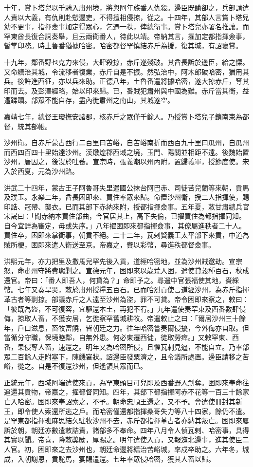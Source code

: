 \begin{pinyinscope}
十年，賞卜塔兒以千騎入肅州境，將與阿年族番人仇殺。邊臣既諭卻之，兵部請遣人責以大義，有仇則赴愬邊吏，不得擅相侵掠，從之。十四年，其部人言賞卜塔兒幼不更事，指揮僉事加定得眾心，乞遷一秩，俾總衛事。賞卜塔兒亦署名推讓。而罕東酋長復合詞奏舉，且云兩衛番人，待此以靖。帝納其言，擢加定都指揮僉事，暫掌印務。時土魯番猶據哈密。哈密都督罕慎結赤斤為援，復其城，有詔褒賞。

十九年，鄰番野乜克力來侵，大肆殺掠，赤斤遂殘破。其酋長訴於邊臣，給之慄。又命繕治其城，令流移者復業，赤斤自是不振。然弘治中，阿木郎破哈密，猶用其兵。後許進西征，亦以兵來助。正德八年，土魯番遣將據哈密，遂大掠赤斤，奪其印而去。及彭澤經略，始以印來歸。已，番賊犯肅州與中國為難。赤斤當其衝，益遭蹂躪。部眾不能自存，盡內徙肅州之南山，其城遂空。

嘉靖七年，總督王瓊撫安諸郡，核赤斤之眾僅千餘人。乃授賞卜塔兒子鎖南束為都督，統其部帳。

沙州衛。自赤斤蒙古西行二百里曰苦峪，自苦峪南折而西百九十里曰瓜州，自瓜州而西四百四十里始達沙州。漢燉煌郡西域之境，玉門、陽關並相距不遠。後魏始置沙州，唐因之，後沒於吐蕃。宣宗時，張義潮以州內附，置歸義軍，授節度使。宋入於西夏，元為沙州路。

洪武二十四年，蒙古王子阿魯哥失里遣國公抹台阿巴赤、司徒苦兒蘭等來朝，貢馬及璞玉。永樂二年，酋長困即來、買住率眾來歸。命置沙州衛，授二人指揮使，賜印誥、冠帶、襲衣。已而其部下赤納來附，授都指揮僉事。五年夏，敕甘肅總兵官宋晟曰：「聞赤納本買住部曲，今官居其上，高下失倫，已擢買住為都指揮同知。自今宜詳為審定，毋或失序。」八年擢困即來都指揮僉事，其僚屬進秩者二十人。買住卒，困即來掌衛事，朝貢不絕。二十二年，瓦剌賢義王太平部下來貢，中道為賊所梗，困即來遣人衛送至京。帝嘉之，賚以彩幣，尋進秩都督僉事。

洪熙元年，亦力把里及撒馬兒罕先後入貢，道經哈密地，並為沙州賊邀劫。宣宗怒，命肅州守將費瓛剿之。宣德元年，困即來以歲荒人困，遣使貸穀種百石，秋成還官。帝曰：「番人即吾人，何貸為？」命即予之。尋遣中官張福使其地，賚綵幣。七年又奏旱災，敕於肅州授糧五百石。已而哈烈貢使言道經沙州，為赤斤指揮革古者等剽掠。部議赤斤之人遠至沙州為盜，罪不可貸。帝令困即來察之，敕曰：「彼既為盜，不可復容，宜驅還本土，再犯不宥。」九年遣使奏罕東及西番數肆侵侮，掠取人畜，不獲安居，乞徙察罕舊城耕牧。帝遣敕止之曰：「爾居沙州三十餘年，戶口滋息，畜牧富饒，皆朝廷之力。往年哈密嘗奏爾侵擾，今外侮亦自取。但當循分守職，保境睦鄰，自無外患。何必東遷西徙，徒取勞瘁。」又敕罕東、西番，果侵奪人畜，速還之。明年又為哈密所侵，且懼瓦剌見逼，不能自立。乃率部眾二百餘人走附塞下，陳饑窘狀。詔邊臣發粟濟之，且令議所處置。邊臣請移之苦峪，從之。自是不復還沙州，但遙領其眾而已。

正統元年，西域阿端遣使來貢，為罕東頭目可兒即及西番野人剽奪。困即來奉命往追還其貢物，帝嘉之，擢都督同知。四年，其部下都指揮阿赤不花等一百三十餘家亡入哈密。困即來奉詔索之，不予。朝命忠順王還之，又不予。會遣使冊封其新王，即令使人索還所逃之戶。而哈密僅還都指揮桑哥失力等八十四家，餘仍不遣。是罕東都指揮班麻思結久駐牧沙州不去，赤斤都指揮革古者亦納其叛亡。困即來屢訴於朝，朝廷亦數遣敕詰責，諸部多不奉命。四年八月令人偵瓦剌、哈密事，具得其實以聞。帝喜，降敕獎勵，厚賜之。明年遣使入貢，又報迤北邊事，進其使臣二人官。初，困即來之去沙州也，朝廷命邊將繕治苦峪城，率戍卒助之。六年冬，城成，入朝謝恩，貢駝馬，宴賜遣還。七年率眾侵哈密，獲其人畜以歸。


\end{pinyinscope}

